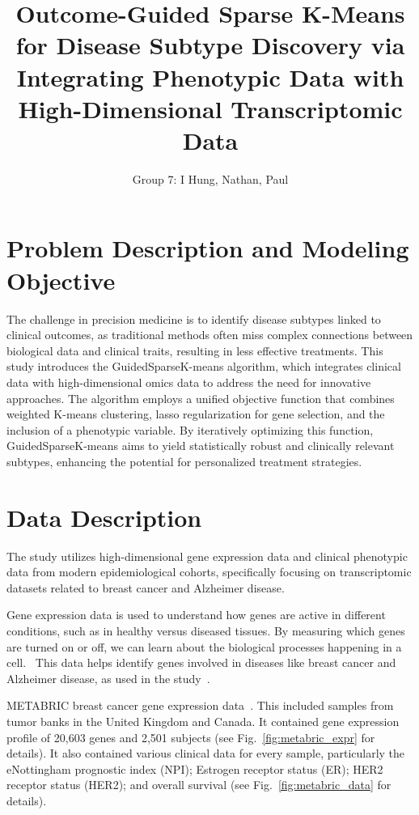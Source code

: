 \documentclass{statsoc}
\title[GuidedSparseKmeans]{Outcome-Guided Sparse K-Means for Disease Subtype Discovery via Integrating Phenotypic Data with High-Dimensional Transcriptomic Data}
\author[]{Group 7: I Hung, Nathan, Paul}
\begin{document}
\section{Problem Description and Modeling Objective}

The challenge in precision medicine is to identify disease subtypes linked to clinical outcomes, as traditional methods often miss complex connections between biological data and clinical traits, resulting in less effective treatments. This study introduces the GuidedSparseK-means algorithm, which integrates clinical data with high-dimensional omics data to address the need for innovative approaches. The algorithm employs a unified objective function that combines weighted K-means clustering, lasso regularization for gene selection, and the inclusion of a phenotypic variable. By iteratively optimizing this function, GuidedSparseK-means aims to yield statistically robust and clinically relevant subtypes, enhancing the potential for personalized treatment strategies.

\section{Data Description}

The study utilizes high-dimensional gene expression data and clinical phenotypic data from modern epidemiological cohorts, specifically focusing on transcriptomic datasets related to breast cancer and Alzheimer disease.

Gene expression data is used to understand how genes are active in different conditions, such as in healthy versus diseased tissues. By measuring which genes are turned on or off, we can learn about the biological processes happening in a cell.~\citep{emilsson2008genetics} This data helps identify genes involved in diseases like breast cancer and Alzheimer disease, as used in the study~\citep{meng2022outcome}.

METABRIC breast cancer gene expression data~\citep{curtis2012genomic}. This included samples from tumor banks in the United Kingdom and Canada. It contained gene expression profile of 20,603 genes and 2,501 subjects (see Fig.~\ref{fig:metabric_expr} for details). It also contained various clinical data for every sample, particularly the eNottingham prognostic index (NPI); Estrogen receptor status (ER); HER2 receptor status (HER2); and overall survival (see Fig.~\ref{fig:metabric_data} for details).
\end{document}
